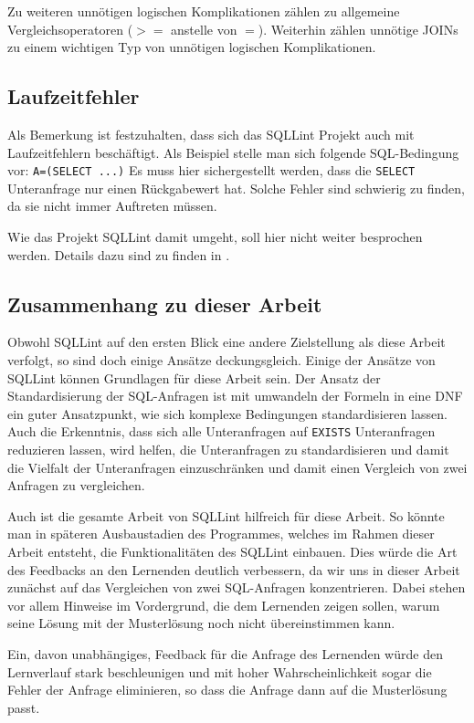Zu weiteren unnötigen logischen Komplikationen zählen zu allgemeine Vergleichsoperatoren ($>=$ anstelle von $=$). Weiterhin zählen unnötige JOINs zu einem wichtigen Typ von unnötigen logischen Komplikationen.

\subsection{Laufzeitfehler}

Als Bemerkung ist festzuhalten, dass sich das SQLLint Projekt auch mit Laufzeitfehlern beschäftigt. Als Beispiel stelle man sich folgende SQL-Bedingung vor: \verb|A=(SELECT ...)| Es muss hier sichergestellt werden, dass die \verb|SELECT| Unteranfrage nur einen Rückgabewert hat. Solche Fehler sind schwierig zu finden, da sie nicht immer Auftreten müssen. 

Wie das Projekt SQLLint damit umgeht, soll hier nicht weiter besprochen werden. Details dazu sind zu finden in \cite{brass2}. 

\subsection*{Zusammenhang zu dieser Arbeit}

Obwohl SQLLint auf den ersten Blick eine andere Zielstellung als diese Arbeit verfolgt, so sind doch einige Ansätze deckungsgleich. Einige der Ansätze von SQLLint können Grundlagen für diese Arbeit sein. Der Ansatz der Standardisierung der SQL-Anfragen ist mit umwandeln der Formeln in eine DNF ein guter Ansatzpunkt, wie sich komplexe Bedingungen standardisieren lassen. Auch die Erkenntnis, dass sich alle Unteranfragen auf \verb|EXISTS| Unteranfragen reduzieren lassen, wird helfen, die Unteranfragen zu standardisieren und damit die Vielfalt der Unteranfragen einzuschränken und damit einen Vergleich von zwei Anfragen zu vergleichen.

Auch ist die gesamte Arbeit von SQLLint hilfreich für diese Arbeit. So könnte man in späteren Ausbaustadien des Programmes, welches im Rahmen dieser Arbeit entsteht, die Funktionalitäten des SQLLint einbauen. Dies würde die Art des Feedbacks an den Lernenden deutlich verbessern, da wir uns in dieser Arbeit zunächst auf das Vergleichen von zwei SQL-Anfragen konzentrieren. Dabei stehen vor allem Hinweise im Vordergrund, die dem Lernenden zeigen sollen, warum seine Lösung mit der Musterlösung noch nicht übereinstimmen kann.

Ein, davon unabhängiges, Feedback für die Anfrage des Lernenden würde den Lernverlauf stark beschleunigen und mit hoher Wahrscheinlichkeit sogar die Fehler der Anfrage eliminieren, so dass die Anfrage dann auf die Musterlösung passt.